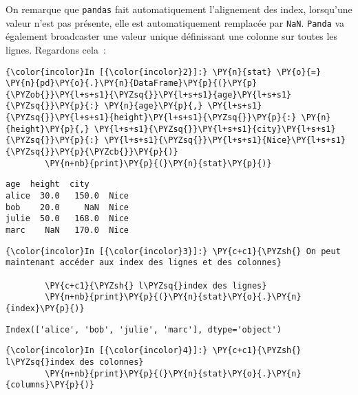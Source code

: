     On remarque que \texttt{pandas} fait automatiquement l'alignement des
index, lorsqu'une valeur n'est pas présente, elle est automatiquement
remplacée par \texttt{NaN}. \texttt{Panda} va également broadcaster une
valeur unique définissant une colonne sur toutes les lignes. Regardons
cela~:

    \begin{Verbatim}[commandchars=\\\{\}]
{\color{incolor}In [{\color{incolor}2}]:} \PY{n}{stat} \PY{o}{=} \PY{n}{pd}\PY{o}{.}\PY{n}{DataFrame}\PY{p}{(}\PY{p}{\PYZob{}}\PY{l+s+s1}{\PYZsq{}}\PY{l+s+s1}{age}\PY{l+s+s1}{\PYZsq{}}\PY{p}{:} \PY{n}{age}\PY{p}{,} \PY{l+s+s1}{\PYZsq{}}\PY{l+s+s1}{height}\PY{l+s+s1}{\PYZsq{}}\PY{p}{:} \PY{n}{height}\PY{p}{,} \PY{l+s+s1}{\PYZsq{}}\PY{l+s+s1}{city}\PY{l+s+s1}{\PYZsq{}}\PY{p}{:} \PY{l+s+s1}{\PYZsq{}}\PY{l+s+s1}{Nice}\PY{l+s+s1}{\PYZsq{}}\PY{p}{\PYZcb{}}\PY{p}{)}
        \PY{n+nb}{print}\PY{p}{(}\PY{n}{stat}\PY{p}{)}
\end{Verbatim}


    \begin{Verbatim}[commandchars=\\\{\}]
        age  height  city
alice  30.0   150.0  Nice
bob    20.0     NaN  Nice
julie  50.0   168.0  Nice
marc    NaN   170.0  Nice

    \end{Verbatim}

    \begin{Verbatim}[commandchars=\\\{\}]
{\color{incolor}In [{\color{incolor}3}]:} \PY{c+c1}{\PYZsh{} On peut maintenant accéder aux index des lignes et des colonnes}
        
        \PY{c+c1}{\PYZsh{} l\PYZsq{}index des lignes}
        \PY{n+nb}{print}\PY{p}{(}\PY{n}{stat}\PY{o}{.}\PY{n}{index}\PY{p}{)}
\end{Verbatim}


    \begin{Verbatim}[commandchars=\\\{\}]
Index(['alice', 'bob', 'julie', 'marc'], dtype='object')

    \end{Verbatim}

    \begin{Verbatim}[commandchars=\\\{\}]
{\color{incolor}In [{\color{incolor}4}]:} \PY{c+c1}{\PYZsh{} l\PYZsq{}index des colonnes}
        \PY{n+nb}{print}\PY{p}{(}\PY{n}{stat}\PY{o}{.}\PY{n}{columns}\PY{p}{)}
\end{Verbatim}


